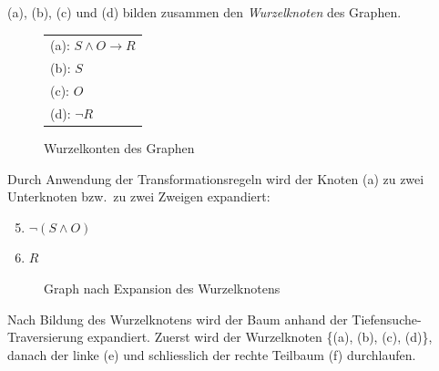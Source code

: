 (a), (b), (c) und (d) bilden zusammen den \textit{Wurzelknoten} des Graphen.
\begin{figure}[htbp]
    \centering
    \parbox{90pt}{
        \begin{framed}

            \begin{tabular}{l}
                (a): $S \wedge O \rightarrow R $ \\
                (b): $S$ \\
                (c): $O$ \\
                (d): $\neg R$ \\
            \end{tabular}
        \end{framed}
    }
    \caption{Wurzelkonten des Graphen}
\end{figure}

\newpage
Durch Anwendung der Transformationsregeln wird der Knoten (a) zu zwei Unterknoten bzw.\ zu zwei Zweigen expandiert:
\begin{enumerate}[label= (\alph*)]
    \setcounter{enumi}{4}
    \item $ \neg(S \wedge O) $
    \item $R$
\end{enumerate}

\begin{figure}[htbp]
    \centering
    \caption{Graph nach Expansion des Wurzelknotens}
\end{figure}

Nach Bildung des Wurzelknotens wird der Baum anhand der Tiefensuche-Traversierung expandiert. Zuerst wird der Wurzelknoten \{(a), (b), (c), (d)\}, danach der linke (e) und schliesslich der rechte Teilbaum (f) durchlaufen.


